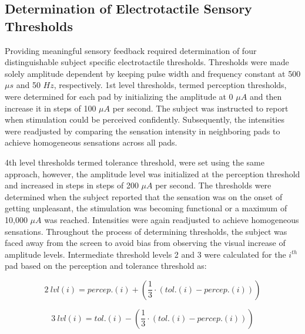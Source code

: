 
\subsection{Determination of Electrotactile Sensory Thresholds}


Providing meaningful sensory feedback required determination of four distinguishable subject specific electrotactile thresholds. Thresholds were made solely amplitude dependent by keeping pulse width and frequency constant at 500 $\mu s$ and 50 $Hz$, respectively. 1st level thresholds, termed perception thresholds, were determined for each pad by initializing the amplitude at 0 $\mu A$ and then increase it in steps of 100 $\mu A$ per second. The subject was instructed to report when stimulation could be perceived confidently. Subsequently, the intensities were readjusted by comparing the sensation intensity in neighboring pads to achieve homogeneous sensations across all pads. 

4th level thresholds termed tolerance threshold, were set using the same approach, however, the amplitude level was initialized at the perception threshold and increased in steps in steps of 200 $\mu A$ per second. The thresholds were determined when the subject reported that the sensation was on the onset of getting unpleasant, the stimulation was becoming functional or a maximum of 10,000 $\mu A$ was reached. Intensities were again readjusted to achieve homogeneous sensations. Throughout the process of determining thresholds, the subject was faced away from the screen to avoid bias from observing the visual increase of amplitude levels. Intermediate threshold levels 2 and 3 were calculated for the $i^{th}$ pad based on the perception and tolerance threshold as: 


	\begin{equation}
	2~lvl(i) = percep.(i) + (\frac{1}{3} \cdot (tol.(i) - percep.(i)))
	\end{equation}

	\begin{equation}
	3~lvl(i) = tol.(i) - (\frac{1}{3} \cdot (tol.(i) - percep.(i)))
	\end{equation}
